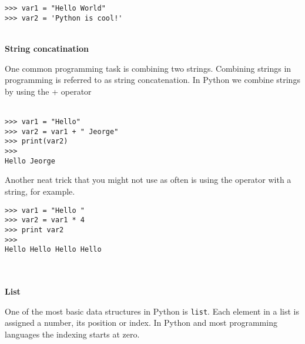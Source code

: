 \documentclass[letterpaper,11pt]{article}
\begin{document}
\\ \\
\begin{minipage}{.5\textwidth}
    \begin{tcolorbox}
        \begin{footnotesize}
            \begin{verbatim}
>>> var1 = "Hello World"
>>> var2 = 'Python is cool!'
            \end{verbatim}
        \end{footnotesize}
    \end{tcolorbox}
\end{minipage}
\\
\textbf{String concatination}
\par{One common programming task is combining two strings. Combining strings in
    programming is referred to as string concatenation. In Python we combine
strings by using the + operator}
\\ \\
\begin{minipage}{.5\textwidth}
    \begin{tcolorbox}
        \begin{footnotesize}
            \begin{verbatim}
>>> var1 = "Hello"
>>> var2 = var1 + " Jeorge"
>>> print(var2)
>>>
Hello Jeorge
            \end{verbatim}
        \end{footnotesize}
    \end{tcolorbox}
\end{minipage}
\par{Another neat trick that you might not use as often is using the \textt{*}
operator with a string, for example.}
\\
\begin{minipage}{.5\textwidth}
    \begin{tcolorbox}
        \begin{footnotesize}
            \begin{verbatim}
>>> var1 = "Hello "
>>> var2 = var1 * 4
>>> print var2 
>>>
Hello Hello Hello Hello 
            \end{verbatim}
        \end{footnotesize}
    \end{tcolorbox}
\end{minipage}
\\ \\
\textbf{List}
\par{One of the most basic data structures in Python is \texttt{list}. Each
element in a list is assigned a number, its position or index. In Python and
most programming languages the indexing starts at zero.}
\end{document}
